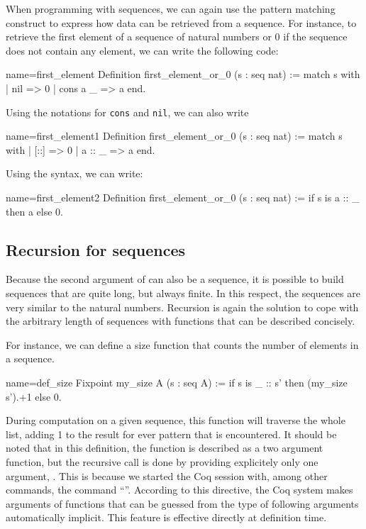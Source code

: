 When programming with sequences, we can again use the  pattern matching
construct to express how data can be retrieved from a sequence.  For
instance, to retrieve the first element of a sequence of natural numbers
or 0 if the sequence does not contain any element, we can write the
following code:

\begin{coq}{name=first_element}{}
Definition first_element_or_0 (s : seq nat) :=
  match s with
  | nil => 0
  | cons a _ => a
  end.
\end{coq}
Using the notations for {\tt cons} and {\tt nil}, we can also write

\begin{coq}{name=first_element1}{}
Definition first_element_or_0 (s : seq nat) :=
  match s with
  | [::] => 0
  | a :: _ => a
  end.
\end{coq}
Using the  syntax, we can write:

\begin{coq}{name=first_element2}{}
Definition first_element_or_0 (s : seq nat) :=
  if s is a :: _ then a else 0.
\end{coq}
\subsection{Recursion for sequences}
Because the second argument of  can also be a sequence, it is
possible to build sequences that are quite long, but always finite.
In this respect, the sequences are very similar to the natural
numbers.  Recursion is again the solution to cope with the arbitrary
length of sequences with functions that can be described concisely.

For instance, we can define a size function that counts the number of
elements in a sequence.

\begin{coq}{name=def_size}{}
Fixpoint my_size A (s : seq A) :=
  if s is _ :: s' then (my_size s').+1 else 0.
\end{coq}
During computation on a given sequence, this function will traverse
the whole list, adding 1 to the result for ever
 pattern that is encountered.  It should be noted that in this
definition, the function  is described as a two argument
function, but the recursive call  is done by providing
explicitely only one argument, .  This is because we started the
Coq session with, among other commands, the command ``''.  According to this directive, the Coq system makes
arguments of functions that can be guessed from the type of following
arguments automatically implicit.  This feature is effective directly
at definition time.

